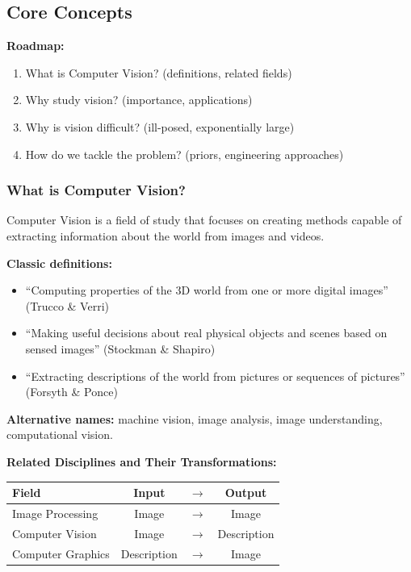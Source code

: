 \subsection{Core Concepts}

\textbf{Roadmap:}
\begin{enumerate}
  \item What is Computer Vision? (definitions, related fields)
  \item Why study vision? (importance, applications)
  \item Why is vision difficult? (ill-posed, exponentially large)
  \item How do we tackle the problem? (priors, engineering approaches)
\end{enumerate}

\bigseparator

\subsubsection{What is Computer Vision?}

\begin{defbox}
Computer Vision is a field of study that focuses on creating methods capable of extracting information about the world from images and videos.
\end{defbox}

\textbf{Classic definitions:}
\begin{itemize}
  \item ``Computing properties of the 3D world from one or more digital images'' (Trucco \& Verri)
  \item ``Making useful decisions about real physical objects and scenes based on sensed images'' (Stockman \& Shapiro)
  \item ``Extracting descriptions of the world from pictures or sequences of pictures'' (Forsyth \& Ponce)
\end{itemize}

\textbf{Alternative names:} machine vision, image analysis, image understanding, computational vision.

\separator

\textbf{Related Disciplines and Their Transformations:}

\begin{center}
\renewcommand{\arraystretch}{1.3}
\begin{tabular}{@{} l c c c @{}}
\toprule
\textbf{Field} & \textbf{Input} & $\rightarrow$ & \textbf{Output} \\
\midrule
Image Processing & Image & $\rightarrow$ & Image \\
Computer Vision & Image & $\rightarrow$ & Description \\
Computer Graphics & Description & $\rightarrow$ & Image \\
\bottomrule
\end{tabular}
\end{center}

